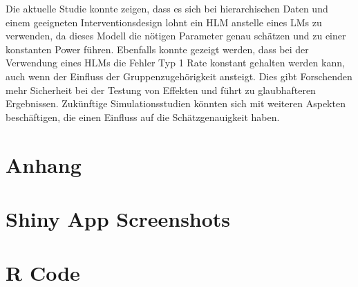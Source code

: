 \documentclass[12pt]{article}\usepackage[]{graphicx}\usepackage[]{color}
\begin{document}
Die aktuelle Studie konnte zeigen, dass es sich bei hierarchischen Daten und einem geeigneten Interventionsdesign lohnt ein HLM anstelle eines LMs zu verwenden, da dieses Modell die nötigen Parameter genau schätzen und zu einer konstanten Power führen. Ebenfalls konnte gezeigt werden, dass bei der Verwendung eines HLMs die Fehler Typ 1 Rate konstant gehalten werden kann, auch wenn der Einfluss der Gruppenzugehörigkeit ansteigt. Dies gibt Forschenden mehr Sicherheit bei der Testung von Effekten und führt zu glaubhafteren Ergebnissen. Zukünftige Simulationsstudien könnten sich mit weiteren Aspekten beschäftigen, die einen Einfluss auf die Schätzgenauigkeit haben.





\newpage
\singlespacing




\section{Anhang}
\appendix
\section{Shiny App Screenshots}
\section{R Code}
\end{document}
